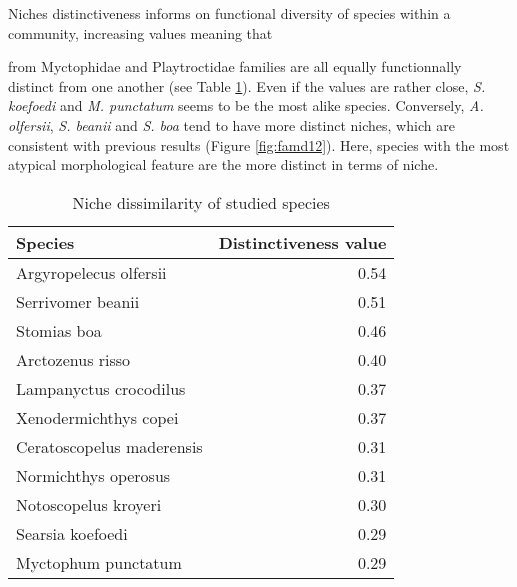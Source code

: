 Niches distinctiveness informs on functional diversity of species within a community, increasing values meaning that 


from Myctophidae and Playtroctidae families are all equally functionnally distinct from one another (see Table \ref{table:nich_diss}). Even if the values are rather close, \textit{S. koefoedi} and \textit{M. punctatum} seems to be the most alike species. Conversely, \textit{A. olfersii}, \textit{S. beanii} and \textit{S. boa} tend to have more distinct niches, which are consistent with previous results (Figure \ref{fig:famd12}). Here, species with the most atypical morphological feature are the more distinct in terms of niche. 

\begin{table}[!htbp]
\centering
\caption[Dissimilarities values of species' niches]{Niche dissimilarity of studied species}
\label{table:nich_diss}
\begin{adjustbox}{max width=1.1\textwidth,center}
\begin{tabular}{lr}
  \hline
Species & Distinctiveness value \\ 
  \hline
Argyropelecus olfersii & 0.54 \\ 
  Serrivomer beanii & 0.51 \\ 
  Stomias boa & 0.46 \\ 
  Arctozenus risso & 0.40 \\ 
  Lampanyctus crocodilus & 0.37 \\ 
  Xenodermichthys copei & 0.37 \\ 
  Ceratoscopelus maderensis & 0.31 \\ 
  Normichthys operosus & 0.31 \\ 
  Notoscopelus kroyeri & 0.30 \\ 
  Searsia koefoedi & 0.29 \\ 
  Myctophum punctatum & 0.29 \\  
   \hline
\end{tabular}
\end{adjustbox}
\end{table}


